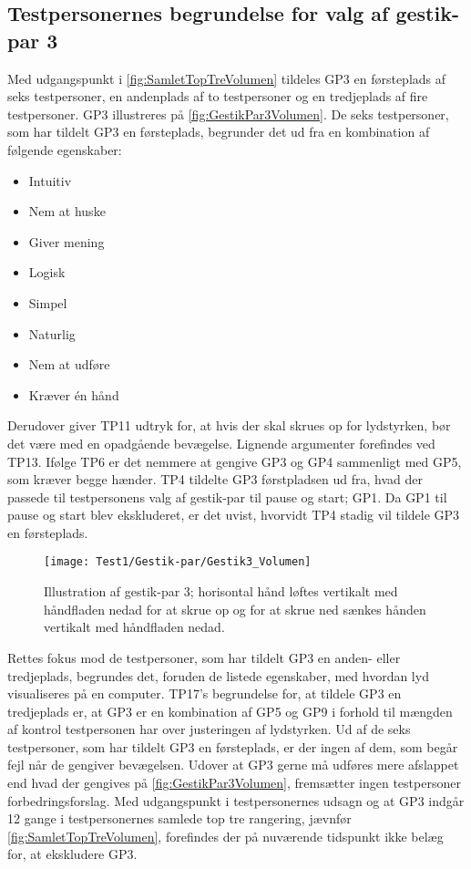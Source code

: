 \subsection{Testpersonernes begrundelse for valg af gestik-par 3}
\label{TestresultaterValgAfGestikkerBegrundelseGP3Volumen}
%
Med udgangspunkt i \autoref{fig:SamletTopTreVolumen} tildeles GP3 en førsteplads af seks testpersoner, en andenplads af to testpersoner og en tredjeplads af fire testpersoner. GP3 illustreres på \autoref{fig:GestikPar3Volumen}. De seks testpersoner, som har tildelt GP3 en førsteplads, begrunder det ud fra en kombination af følgende egenskaber: 
%
\begin{multicols}{3}
    \begin{itemize}
        \item Intuitiv
        \item Nem at huske
        \item Giver mening
        \item Logisk
        \item Simpel
        \item Naturlig
        \item Nem at udføre
        \item Kræver én hånd
\end{itemize}
\end{multicols}
\noindent
%
Derudover giver TP11 udtryk for, at hvis der skal skrues op for lydstyrken, bør det være med en opadgående bevægelse. Lignende argumenter forefindes ved TP13. Ifølge TP6 er det nemmere at gengive GP3 og GP4 sammenligt med GP5, som kræver begge hænder. TP4 tildelte GP3 førstpladsen ud fra, hvad der passede til testpersonens valg af gestik-par til pause og start; GP1. Da GP1 til pause og start blev ekskluderet, er det uvist, hvorvidt TP4 stadig vil tildele GP3 en førsteplads. 
%
\begin{figure}[H]
	\centering
	\texttt{[image: Test1/Gestik-par/Gestik3\_Volumen]}
	\caption{Illustration af gestik-par 3; horisontal hånd løftes vertikalt med håndfladen nedad for at skrue op og for at skrue ned sænkes hånden vertikalt med håndfladen nedad.}
	\label{fig:GestikPar3Volumen}
\end{figure}
\noindent
%
Rettes fokus mod de testpersoner, som har tildelt GP3 en anden- eller tredjeplads, begrundes det, foruden de listede egenskaber, med hvordan lyd visualiseres på en computer. TP17's begrundelse for, at tildele GP3 en tredjeplads er, at GP3 er en kombination af GP5 og GP9 i forhold til mængden af kontrol testpersonen har over justeringen af lydstyrken. \blankline
%      
Ud af de seks testpersoner, som har tildelt GP3 en førsteplads, er der ingen af dem, som begår fejl når de gengiver bevægelsen. Udover at GP3 gerne må udføres mere afslappet end hvad der gengives på \autoref{fig:GestikPar3Volumen}, fremsætter ingen testpersoner forbedringsforslag.\blankline
%
Med udgangspunkt i testpersonernes udsagn og at GP3 indgår 12 gange i testpersonernes samlede top tre rangering, jævnfør \autoref{fig:SamletTopTreVolumen}, forefindes der på nuværende tidspunkt ikke belæg for, at ekskludere GP3. 
%
